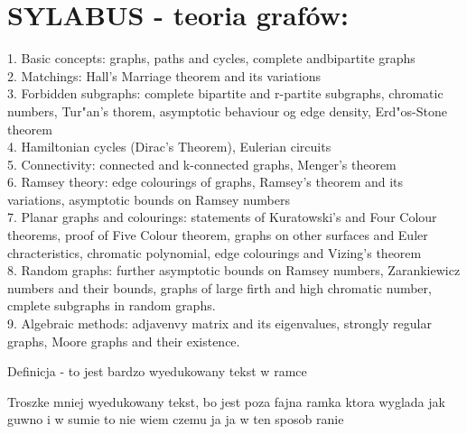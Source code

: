 \documentclass{article}[13pt]
\begin{document}
\newpage

\section*{SYLABUS - teoria grafów:}
1. Basic concepts: graphs, paths and cycles, complete andbipartite graphs\\
2. Matchings: Hall's Marriage theorem and its variations\\
3. Forbidden subgraphs: complete bipartite and r-partite subgraphs, chromatic numbers, Tur"an's thorem, asymptotic behaviour og edge density, Erd"os-Stone theorem\\
4. Hamiltonian cycles (Dirac's Theorem), Eulerian circuits\\
5. Connectivity: connected and k-connected graphs, Menger's theorem\\
6. Ramsey theory: edge colourings of graphs, Ramsey's theorem and its variations, asymptotic bounds on Ramsey numbers\\
7. Planar graphs and colourings: statements of Kuratowski's and Four Colour theorems, proof of Five Colour theorem, graphs on other surfaces and Euler chracteristics, chromatic polynomial, edge colourings and Vizing's theorem\\
8. Random graphs: further asymptotic bounds on Ramsey numbers, Zarankiewicz numbers and their bounds, graphs of large firth and high chromatic number, cmplete subgraphs in random graphs.\\
9. Algebraic methods: adjavenvy matrix and its eigenvalues, strongly regular graphs, Moore graphs and their existence.

\newpage


\tableofcontents

\newpage

\begin{multicols*}{2}
    
\begin{mdframed}[style=definicja]
    {\color{def}Definicja} - to jest bardzo {\color{acc}wyedukowany} tekst w ramce 
\end{mdframed}

Troszke mniej wyedukowany tekst, bo jest poza fajna ramka ktora wyglada jak guwno i w sumie to nie wiem czemu ja ja w ten sposob ranie
\end{multicols*}


\end{document}
